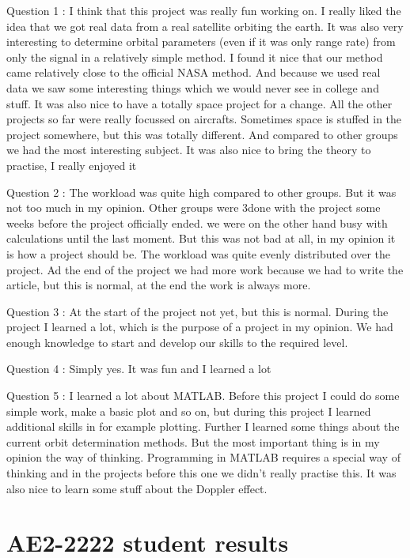 \documentclass[11pt,a4paper,oneside]{article}
\newcommand{\listskip}{0pt}
\newenvironment{description*}
{\begin{description}
  \setlength{\itemsep}{\listskip}
  \setlength{\parskip}{\listskip}
  \setlength{\parsep}{\listskip}}
{\end{description}}
\begin{document}
\begin{description*}
\item[Question 1]: I think that this project was really fun working on. I really liked the idea that we got real data from a real satellite orbiting the earth. It was also very interesting to determine orbital parameters (even if it was only range rate) from only the signal in a relatively simple method. I found it nice that our method came relatively close to the official NASA method. And because we used real data we saw some interesting things which we would never see in college and stuff. It was also nice to have a totally space project for a change. All the other projects so far were really focussed on aircrafts. Sometimes space is stuffed in the project somewhere, but this was totally different. And compared to other groups we had the most interesting subject. It was also nice to bring the theory to practise, I really enjoyed it
\item[Question 2]: The workload was quite high compared to other groups. But it was not too much in my opinion. Other groups were 3done with the project some weeks before the project officially ended. we were on the other hand busy with calculations until the last moment. But this was not bad at all, in my opinion it is how a project should be. The workload was quite evenly distributed over the project. Ad the end of the project we had more work because we had to write the article, but this is normal, at the end the work is always more.
\item[Question 3]: At the start of the project not yet, but this is normal. During the project I learned a lot, which is the purpose of a project in my opinion. We had enough knowledge to start and develop our skills to the required level.
\item[Question 4]: Simply yes. It was fun and I learned a lot
\item[Question 5]: I learned a lot about \ac{MATLAB}. Before this project I could do some simple work, make a basic plot and so on, but during this project I learned additional skills in for example plotting. Further I learned some things about the current orbit determination methods. But the most important thing is in my opinion the way of thinking. Programming in \ac{MATLAB} requires a special way of thinking and in the projects before this one we didn't really practise this. It was also nice to learn some stuff about the Doppler effect.
\end{description*}

\newpage
\section{AE2-2222 student results} \label{sec:appendixB}



% 
% 

\end{document}
